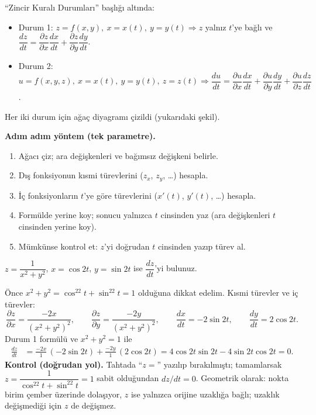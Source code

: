 \begin{tahta}
``Zincir Kuralı Durumları'' başlığı altında:
\begin{itemize}
  \item Durum 1: $z=f(x,y),\ x=x(t),\ y=y(t)\Rightarrow z$ yalnız $t$'ye bağlı ve
        $\dfrac{dz}{dt}=\dfrac{\partial z}{\partial x}\dfrac{dx}{dt}+\dfrac{\partial z}{\partial y}\dfrac{dy}{dt}$.
  \item Durum 2: $u=f(x,y,z),\ x=x(t),\ y=y(t),\ z=z(t)\Rightarrow
        \dfrac{du}{dt}=\dfrac{\partial u}{\partial x}\dfrac{dx}{dt}+\dfrac{\partial u}{\partial y}\dfrac{dy}{dt}+\dfrac{\partial u}{\partial z}\dfrac{dz}{dt}$.
\end{itemize}
Her iki durum için ağaç diyagramı çizildi (yukarıdaki şekil).
\end{tahta}

\textbf{Adım adım yöntem (tek parametre).}
\begin{enumerate}
  \item Ağacı çiz; ara değişkenleri ve bağımsız değişkeni belirle.
  \item Dış fonksiyonun kısmi türevlerini ($z_x$, $z_y$, \dots) hesapla.
  \item İç fonksiyonların $t$'ye göre türevlerini ($x'(t)$, $y'(t)$, \dots) hesapla.
  \item Formülde yerine koy; sonucu yalnızca $t$ cinsinden yaz (ara değişkenleri $t$ cinsinden yerine koy).
  \item Mümkünse kontrol et: $z$'yi doğrudan $t$ cinsinden yazıp türev al.
\end{enumerate}

\begin{soru}
$z=\dfrac{1}{x^2+y^2}$, $x=\cos2t$, $y=\sin2t$ ise $\dfrac{dz}{dt}$'yi bulunuz.
\end{soru}
\begin{cevap}
Önce $x^2+y^2=\cos^22t+\sin^22t=1$ olduğuna dikkat edelim. Kısmi türevler ve iç türevler:
\[
\frac{\partial z}{\partial x}=\frac{-2x}{(x^2+y^2)^2},\qquad
\frac{\partial z}{\partial y}=\frac{-2y}{(x^2+y^2)^2},\qquad
\frac{dx}{dt}=-2\sin2t,\qquad \frac{dy}{dt}=2\cos2t .
\]
Durum 1 formülü ve $x^2+y^2=1$ ile
\begin{align*}
\frac{dz}{dt}&=\frac{-2x}{1}\,(-2\sin2t)+\frac{-2y}{1}\,(2\cos2t)
=4\cos2t\sin2t-4\sin2t\cos2t=\boxed{0}.
\end{align*}
\textbf{Kontrol (doğrudan yol).} Tahtada ``$z=$'' yazılıp bırakılmıştı; tamamlarsak
$z=\dfrac{1}{\cos^22t+\sin^22t}=1$ sabit olduğundan $dz/dt=0$. Geometrik olarak: nokta birim çember üzerinde dolaşıyor,
$z$ ise yalnızca orijine uzaklığa bağlı; uzaklık değişmediği için $z$ de değişmez.
\end{cevap}

